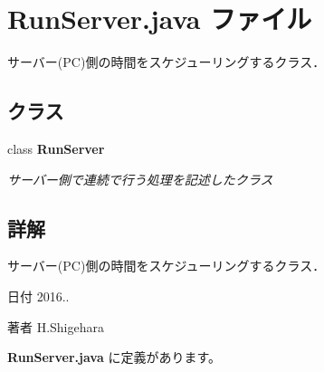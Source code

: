 \section{Run\-Server.\-java ファイル}
\label{_run_server_8java}


サーバー(\-P\-C)側の時間をスケジューリングするクラス．  


\subsection*{クラス}
\begin{DoxyCompactItemize}
\item 
class {\bf Run\-Server}
\begin{DoxyCompactList}\small\item\em サーバー側で連続で行う処理を記述したクラス \end{DoxyCompactList}\end{DoxyCompactItemize}


\subsection{詳解}
サーバー(\-P\-C)側の時間をスケジューリングするクラス． \begin{DoxyDate}{日付}
2016.. 
\end{DoxyDate}
\begin{DoxyAuthor}{著者}
H.\-Shigehara 
\end{DoxyAuthor}


 {\bf Run\-Server.\-java} に定義があります。

